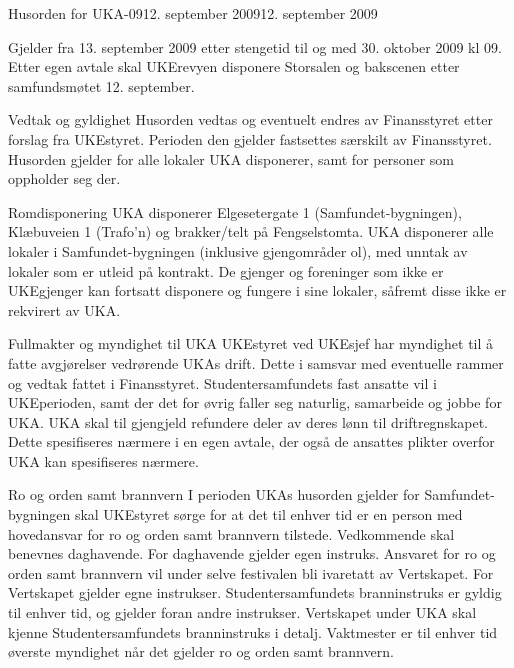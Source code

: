 \begin{instruks}{Husorden for UKA-09}{12. september 2009}{12. september 2009}

Gjelder fra 13. september 2009 etter stengetid til og med 30. oktober 2009 kl 09.
Etter egen avtale skal UKErevyen disponere Storsalen og bakscenen etter samfundsmøtet 12.
september.


\begin{instruksledd}{Vedtak og gyldighet}
Husorden vedtas og eventuelt endres av Finansstyret etter forslag fra UKEstyret. Perioden
den gjelder fastsettes særskilt av Finansstyret. Husorden gjelder for alle lokaler UKA
disponerer, samt for personer som oppholder seg der.
\end{instruksledd}

\begin{instruksledd}{Romdisponering}
UKA disponerer Elgesetergate 1 (Samfundet-bygningen), Klæbuveien 1 (Trafo’n) og
brakker/telt på Fengselstomta. UKA disponerer alle lokaler i Samfundet-bygningen (inklusive
gjengområder ol), med unntak av lokaler som er utleid på kontrakt. De gjenger og
foreninger som ikke er UKEgjenger kan fortsatt disponere og fungere i sine lokaler, såfremt
disse ikke er rekvirert av UKA.
\end{instruksledd}

\begin{instruksledd}{Fullmakter og myndighet til UKA}
UKEstyret ved UKEsjef har myndighet til å fatte avgjørelser vedrørende UKAs drift. Dette i
samsvar med eventuelle rammer og vedtak fattet i Finansstyret. Studentersamfundets fast
ansatte vil i UKEperioden, samt der det for øvrig faller seg naturlig, samarbeide og jobbe for
UKA. UKA skal til gjengjeld refundere deler av deres lønn til driftregnskapet. Dette
spesifiseres nærmere i en egen avtale, der også de ansattes plikter overfor UKA kan
spesifiseres nærmere.
\end{instruksledd}

\begin{instruksledd}{Ro og orden samt brannvern}
I perioden UKAs husorden gjelder for Samfundet-bygningen skal UKEstyret sørge for at det
til enhver tid er en person med hovedansvar for ro og orden samt brannvern tilstede.
Vedkommende skal benevnes daghavende. For daghavende gjelder egen instruks. Ansvaret
for ro og orden samt brannvern vil under selve festivalen bli ivaretatt av Vertskapet. For
Vertskapet gjelder egne instrukser. Studentersamfundets branninstruks er gyldig til enhver
tid, og gjelder foran andre instrukser. Vertskapet under UKA skal kjenne
Studentersamfundets branninstruks i detalj. Vaktmester er til enhver tid øverste myndighet
når det gjelder ro og orden samt brannvern.
\end{instruksledd}


\end{instruks}
